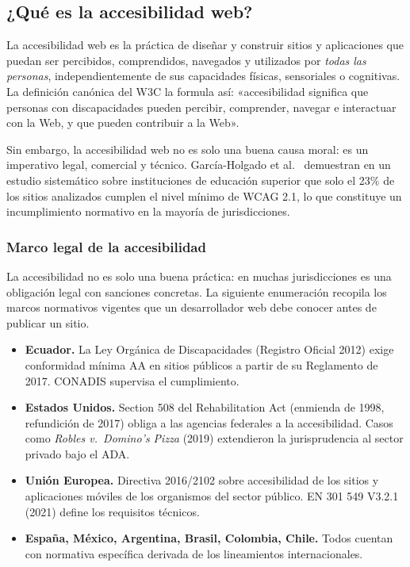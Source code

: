 \subsection{¿Qué es la accesibilidad web?}

La accesibilidad web es la práctica de diseñar y construir sitios y
aplicaciones que puedan ser percibidos, comprendidos, navegados y
utilizados por \emph{todas las personas}, independientemente de sus
capacidades físicas, sensoriales o cognitivas. La definición canónica
del W3C \cite{w3c2018wcag} la formula así: «accesibilidad significa
que personas con discapacidades pueden percibir, comprender, navegar
e interactuar con la Web, y que pueden contribuir a la Web».

Sin embargo, la accesibilidad web no es solo una buena causa moral:
es un imperativo legal, comercial y técnico. García-Holgado et al.\
\cite{henry2018accessibility} demuestran en un estudio sistemático sobre
instituciones de educación superior que solo el 23\% de los sitios
analizados cumplen el nivel mínimo de WCAG 2.1, lo que constituye un
incumplimiento normativo en la mayoría de jurisdicciones.

\subsubsection{Marco legal de la accesibilidad}

La accesibilidad no es solo una buena práctica: en muchas
jurisdicciones es una obligación legal con sanciones concretas. La
siguiente enumeración recopila los marcos normativos vigentes que un
desarrollador web debe conocer antes de publicar un sitio.


\begin{itemize}
\item \textbf{Ecuador.} La Ley Orgánica de Discapacidades (Registro
Oficial 2012) exige conformidad mínima AA en sitios públicos a partir
de su Reglamento de 2017. CONADIS supervisa el cumplimiento.
\item \textbf{Estados Unidos.} Section 508 del Rehabilitation Act
(enmienda de 1998, refundición de 2017) obliga a las agencias
federales a la accesibilidad. Casos como \emph{Robles v.\ Domino's
Pizza} (2019) extendieron la jurisprudencia al sector privado bajo el
ADA.
\item \textbf{Unión Europea.} Directiva 2016/2102 sobre accesibilidad
de los sitios y aplicaciones móviles de los organismos del sector
público. EN 301 549 V3.2.1 (2021) define los requisitos técnicos.
\item \textbf{España, México, Argentina, Brasil, Colombia, Chile.}
Todos cuentan con normativa específica derivada de los lineamientos
internacionales.
\end{itemize}

